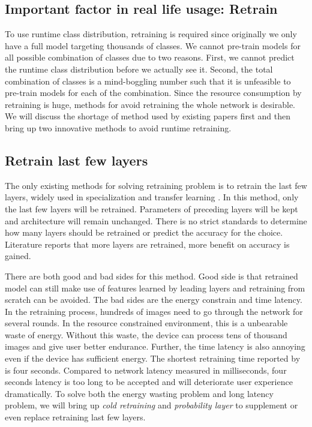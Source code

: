 \documentclass[conference]{IEEEtran}
\begin{document}
\begin{spacing}{0.9}
\section{Important factor in real life usage: Retrain}
To use runtime class distribution, retraining is required since originally we only have a full model targeting thousands of classes. We cannot pre-train models for all possible combination of classes due to two reasons. First, we cannot predict the runtime class distribution before we actually see it. Second, the total combination of classes is a mind-boggling number such that it is unfeasible to pre-train models for each of the combination. Since the resource consumption by retraining is huge, methods for avoid retraining the whole network is desirable. We will discuss the shortage of method used by existing papers first and then bring up two innovative methods to avoid runtime retraining.


\subsection{Retrain last few layers}
The only existing methods for solving retraining problem is to retrain the last few layers, widely used in specialization \cite{han2016mcdnn, kang2017noscope, shen2017fast} and transfer learning \cite{razavian2014cnn, zhuang2015supervised, sun2016return}. In this method, only the last few layers will be retrained. Parameters of preceding layers will be kept and architecture will remain unchanged. There is no strict standards to determine how many layers should be retrained or predict the accuracy for the choice. Literature reports that more layers are retrained, more benefit on accuracy is gained. 

There are both good and bad sides for this method. Good side is that retrained model can still make use of features learned by leading layers and retraining from scratch can be avoided. The bad sides are the energy constrain and time latency. In the retraining process, hundreds of images need to go through the network for several rounds. In the resource constrained environment, this is a unbearable waste of energy. Without this waste, the device can process tens of thousand images and give user better endurance. Further, the time latency is also annoying even if the device has sufficient energy. The shortest retraining time reported by \cite{shen2016fast} is four seconds. Compared to network latency measured in milliseconds, four seconds latency is too long to be accepted and will deteriorate user experience dramatically. To solve both the energy wasting problem and long latency problem, we will bring up \textit{cold retraining} and \textit{probability layer} to supplement or even replace retraining last few layers.


\end{spacing}
\end{document}
